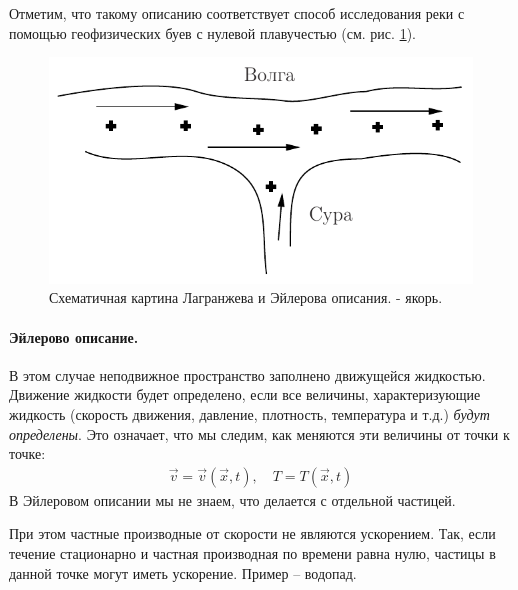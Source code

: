 Отметим, что такому описанию соответствует способ исследования реки с помощью геофизических буев с нулевой плавучестью (см. рис. \ref{fig:figure3}).
\begin{figure}[H]
	\centering
	\includegraphics[scale=1]{photo/3.pdf}
	\caption{Схематичная картина Лагранжева и Эйлерова описания.  - якорь.}
	\label{fig:figure3}
\end{figure}

\paragraph{Эйлерово описание.} В этом случае неподвижное пространство заполнено движущейся жидкостью. Движение жидкости будет определено, если все величины, характеризующие жидкость (скорость движения, давление, плотность, температура и т.д.) \textit{будут определены}.
Это означает, что мы следим, как меняются эти величины от точки к точке:
\begin{align*} 
	\vec{v} =\vec{v}(\vec{x}, t), \quad
	T = T(\vec{x}, t)
\end{align*}
В Эйлеровом описании мы не знаем, что делается с отдельной частицей. 

При этом частные производные от скорости не являются ускорением. Так, если течение стационарно и частная производная по времени  равна нулю, частицы в данной точке могут иметь ускорение. Пример -- водопад.

